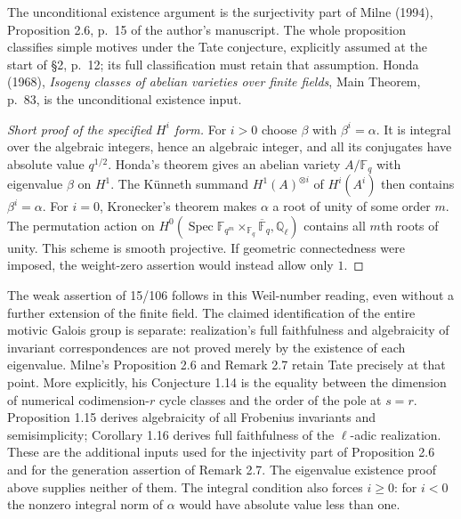 \documentclass[11pt,a4paper]{article}
\theoremstyle{definition}\newtheorem{definition}[theorem]{Definition}
\theoremstyle{remark}\newtheorem{remark}[theorem]{Remark}
\begin{document}
The unconditional existence argument is the surjectivity
part of Milne (1994), Proposition 2.6, p.~15 of the author's
manuscript. The whole proposition classifies simple motives
under the Tate conjecture, explicitly assumed at the start
of \S2, p.~12; its full classification must retain that
assumption. Honda (1968), \emph{Isogeny classes of abelian
varieties over finite fields}, Main Theorem, p.~83, is
the unconditional existence input.
\begin{proof}[Short proof of the specified $H^i$ form]
For $i>0$ choose $\beta$ with $\beta^i=\alpha$.
It is integral over the algebraic integers, hence an
algebraic integer, and all its conjugates have absolute
value $q^{1/2}$. Honda's theorem gives an abelian variety
$A/\mathbb F_q$ with eigenvalue $\beta$ on $H^1$.
The K\"unneth summand $H^1(A)^{\otimes i}$ of $H^i(A^i)$
then contains $\beta^i=\alpha$.
For $i=0$, Kronecker's theorem makes $\alpha$ a root of
unity of some order $m$. The permutation action on
$H^0(\operatorname{Spec}\mathbb F_{q^m}
\times_{\mathbb F_q}\overline{\mathbb F}_q,\mathbb Q_\ell)$
contains all $m$th roots of unity. This scheme is smooth
projective. If geometric connectedness were imposed,
the weight-zero assertion would instead allow only $1$.
\end{proof}
The weak assertion of 15/106 follows in this Weil-number
reading, even without a further extension of the finite
field. The claimed identification of the entire motivic
Galois group is separate: realization's full faithfulness
and algebraicity of invariant correspondences are not
proved merely by the existence of each eigenvalue.
Milne's Proposition 2.6 and Remark 2.7 retain Tate precisely
at that point.
More explicitly, his Conjecture 1.14 is the equality
between the dimension of numerical codimension-$r$
cycle classes and the order of the pole at $s=r$.
Proposition 1.15 derives algebraicity of all Frobenius
invariants and semisimplicity; Corollary 1.16 derives
full faithfulness of the $\ell$-adic realization.
These are the additional inputs used for the
injectivity part of Proposition 2.6 and for the
generation assertion of Remark 2.7. The eigenvalue
existence proof above supplies neither of them.
The integral condition also forces $i\geq0$:
for $i<0$ the nonzero integral norm of $\alpha$
would have absolute value less than one.
\end{document}
